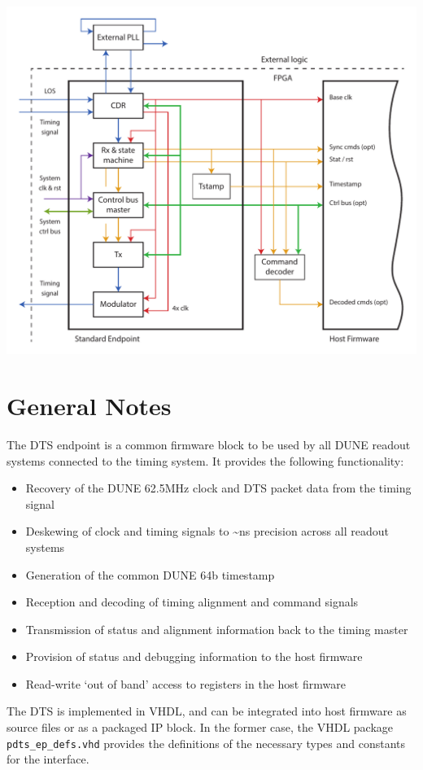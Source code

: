 \documentclass{article}
\begin{document}
\includegraphics[width=1\textwidth]{endpoint_structure.pdf}


\section{General Notes}

The DTS endpoint is a common firmware block to be used by all DUNE readout systems connected to the timing system. It provides the following functionality:
\begin{itemize}
\item Recovery of the DUNE 62.5MHz clock and DTS packet data from the timing signal
\item Deskewing of clock and timing signals to \textasciitilde{}ns precision across all readout systems
\item Generation of the common DUNE 64b timestamp
\item Reception and decoding of timing alignment and command signals
\item Transmission of status and alignment information back to the timing master
\item Provision of status and debugging information to the host firmware
\item Read-write ‘out of band’ access to registers in the host firmware
\end{itemize}
The DTS is implemented in VHDL, and can be integrated into host firmware as source files or as a packaged IP block. In the former case, the VHDL package \texttt{pdts\_ep\_defs.vhd} provides the definitions of the necessary types and constants for the interface.
\end{document}
